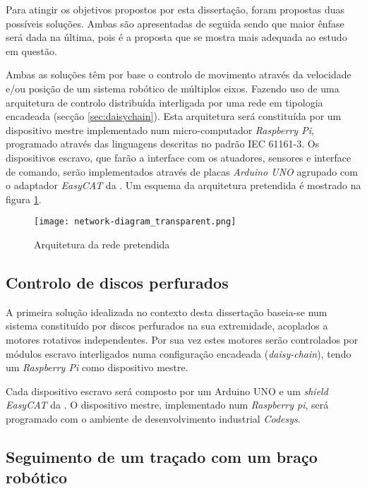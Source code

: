 Para atingir os objetivos propostos por esta dissertação, foram propostas 
duas possíveis soluções. Ambas são apresentadas de seguida sendo que
maior ênfase será dada na última, pois é a proposta que se mostra mais
adequada ao estudo em questão.

Ambas as soluções têm por base o controlo de movimento através da velocidade
e/ou posição de um sistema robótico de múltiplos eixos. Fazendo uso de
uma arquitetura de controlo distribuída interligada por uma rede \ecat
em tipologia encadeada (secção \ref{sec:daisychain}). Esta arquitetura
será constituída por um dispositivo mestre implementado num micro-computador
\emph{Raspberry Pi}, programado através das linguagens descritas no padrão
IEC 61161-3. Os dispositivos escravo, que farão a interface com os atuadores,
sensores e interface de comando, serão implementados através de placas
\emph{Arduino UNO} agrupado com o adaptador \emph{EasyCAT} da \cite{ABT:EasyCAT}.
Um esquema da arquitetura pretendida é mostrado na figura
\ref{fig:network-architecture}.

\begin{figure}
 \centering
 \texttt{[image: network-diagram\_transparent.png]}
 \caption{Arquitetura da rede \ecat pretendida}
 \label{fig:network-architecture}
\end{figure}



\subsection{Controlo de discos perfurados}

A primeira solução idealizada no contexto desta dissertação baseia-se num
sistema constituído por discos perfurados na sua extremidade, acoplados
a motores rotativos independentes. Por sua vez estes motores serão
controlados por módulos \ecat escravo interligados numa configuração
encadeada (\emph{daisy-chain}), tendo um \emph{Raspberry Pi} como dispositivo
mestre.

Cada dispositivo \ecat escravo será composto por um Arduino UNO 
\cite[]{arduino:ArduinoUNORev3} e um \emph{shield EasyCAT} da 
\cite{ABT:EasyCAT}. O dispositivo mestre, implementado num \emph{Raspberry
pi}, será programado com o ambiente de desenvolvimento industrial \emph{
Codesys}.

\subsection{Seguimento de um traçado com um braço robótico}


